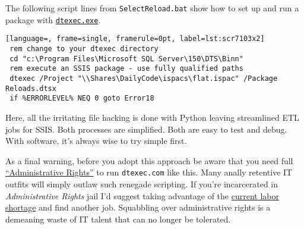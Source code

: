 The following script lines from \texttt{SelectReload.bat} show how to
set up and run a package with
\href{https://docs.microsoft.com/en-us/sql/integration-services/packages/dtexec-utility?view=sql-server-ver15}{\texttt{dtexec.exe}}.


\begin{tcolorbox}[breakable, size=fbox, boxrule=1pt, pad at break*=1mm,colback=cellbackground, colframe=cellborder]
\begin{lstlisting}[language=, frame=single, framerule=0pt, label=lst:scr7103x2]
 rem change to your dtexec directory
 cd "c:\Program Files\Microsoft SQL Server\150\DTS\Binn"
 rem execute an SSIS package - use fully qualified paths
 dtexec /Project "\\Shares\DailyCode\ispacs\flat.ispac" /Package Reloads.dtsx
 if %ERRORLEVEL% NEQ 0 goto Error18
\end{lstlisting}
\end{tcolorbox}


Here, all the irritating file hacking is done with Python leaving
streamlined ETL jobs for SSIS. Both processes are simplified. Both are
easy to test and debug. With software, it's always wise to try simple
first.

As a final warning, before you adopt this approach be aware that you
need full
\href{https://www.makeuseof.com/tag/windows-admin-rights/}{``Administrative
Rights''} to run \texttt{dtexec.com} like this. Many anally retentive IT
outfits will simply outlaw such renegade scripting. If you're
incarcerated in \emph{Administrative Rights} jail I'd suggest taking
advantage of the
\href{https://inthesetimes.com/article/labor-shortage-jobs-report-low-wages-biden-covid}{current
labor shortage} and find another job. Squabbling over administrative
rights is a demeaning waste of IT talent that can no longer be
tolerated.

